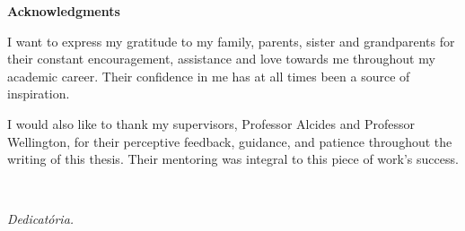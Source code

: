 %
%


\vspace*{2cm}
\begin{center}
\Large \bf Acknowledgments
\end{center}
\vspace*{1cm} \setlength{\baselineskip}{0.6cm}


I want to express my gratitude to my family, parents, sister and grandparents for their constant encouragement, assistance and love towards me throughout my academic career. Their confidence in me has at all times been a source of inspiration.

I would also like to thank my supervisors, Professor Alcides and Professor Wellington, for their perceptive feedback, guidance, and patience throughout the writing of this thesis. Their mentoring was integral to this piece of work's success.

\LIMPA

~
\vfill

\begin{flushright}\textit{Dedicatória.}\end{flushright}


